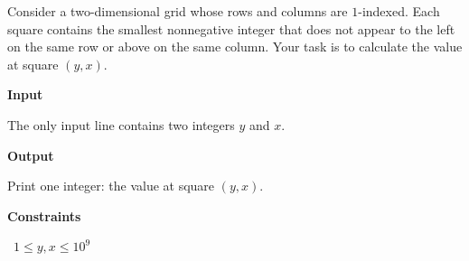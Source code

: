 Consider a two-dimensional grid whose rows and columns are $1$-indexed. Each square contains the smallest nonnegative integer that does not appear to the left on the same row or above on the same column.
Your task is to calculate the value at square $(y,x)$.

\vspace{0.3cm}\noindent\textbf{Input}

The only input line contains two integers $y$ and $x$.

\vspace{0.3cm}\noindent\textbf{Output}

Print one integer: the value at square $(y,x)$.

\vspace{0.3cm}\noindent\textbf{Constraints}

\textbullet\ $1 \le y,x \le 10^9$
